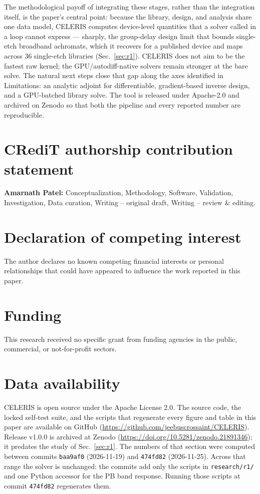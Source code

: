 \documentclass[preprint,12pt]{elsarticle}
\begin{document}
The methodological payoff of integrating these stages, rather than the integration
itself, is the paper's central point: because the library, design, and analysis
share one data model, CELERIS computes device-level quantities that a solver called
in a loop cannot express --- sharply, the group-delay design limit that bounds
single-etch broadband achromats, which it recovers for a published device and maps
across 36 single-etch libraries (Sec.~\ref{sec:r1}). CELERIS
does not aim to be the fastest raw kernel; the GPU/autodiff-native solvers remain
stronger at the bare solve. The natural next steps close that gap along the axes
identified in Limitations: an analytic adjoint for differentiable, gradient-based
inverse design, and a GPU-batched library solve. The tool is released under Apache-2.0
and archived on Zenodo so that both the pipeline and every reported number are
reproducible.

\section*{CRediT authorship contribution statement}
\textbf{Amarnath Patel:} Conceptualization, Methodology, Software, Validation,
Investigation, Data curation, Writing -- original draft, Writing -- review \& editing.

\section*{Declaration of competing interest}
The author declares no known competing financial interests or personal relationships
that could have appeared to influence the work reported in this paper.

\section*{Funding}
This research received no specific grant from funding agencies in the public,
commercial, or not-for-profit sectors.

\section*{Data availability}
CELERIS is open source under the Apache License 2.0. The source code, the locked
self-test suite, and the scripts that regenerate every figure and table in this paper
are available on GitHub (\url{https://github.com/jeebuscrossaint/CELERIS}). Release
v1.0.0 is archived at Zenodo (\url{https://doi.org/10.5281/zenodo.21891346}); it predates
the study of Sec.~\ref{sec:r1}. The numbers of that section were computed between
commits \texttt{baa9af0} (2026-11-19) and \texttt{474fd82} (2026-11-25). Across that
range the solver is unchanged: the commits add only the scripts in \texttt{research/r1/}
and one Python accessor for the PB band response. Running those scripts at commit
\texttt{474fd82} regenerates them.
\end{document}
